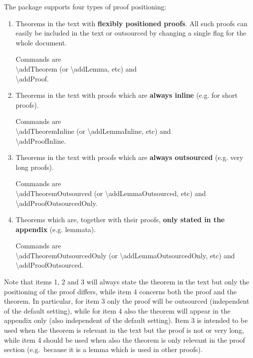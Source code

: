 \documentclass{article}
\begin{document}
		The package supports four types of proof positioning:
		\begin{enumerate}
			\item Theorems in the text with \textbf{flexibly positioned proofs}. All such proofs can easily be included in the text or outsourced by changing a single flag for the whole document.

				Commands are \\
				\textbackslash{}addTheorem (or \textbackslash{}addLemma, etc) and \\
				\textbackslash{}addProof.
			\item Theorems in the text with proofs which are \textbf{always inline} (e.g. for short proofs).

				Commands are \\
				\textbackslash{}addTheoremInline (or \textbackslash{}addLemmaInline, etc) and \\
				\textbackslash{}addProofInline.
			\item Theorems in the text with proofs which are \textbf{always outsourced} (e.g. very long proofs).

				Commands are \\
				\textbackslash{}addTheoremOutsourced (or \textbackslash{}addLemmaOutsourced, etc) and \\
				\textbackslash{}addProofOutsourcedOnly.
			\item Theorems which are, together with their proofs, \textbf{only stated in the appendix} (e.g. lemmata).

				Commands are \\
				\textbackslash{}addTheoremOutsourcedOnly (or \textbackslash{}addLemmaOutsourcedOnly, etc) and \\
				\textbackslash{}addProofOutsourced.
		\end{enumerate}
		
		Note that items 1, 2 and 3 will always state the theorem in the text but only the positioning of the proof differs,
		while item 4 concerns both the proof and the theorem.
		In particular, for item 3 only the proof will be outsourced (independent of the default setting),
		while for item 4 also the theorem will appear in the appendix only (also independent of the default setting).
		Item 3 is intended to be used when the theorem is relevant in the text but the proof is not or very long,
		while item 4 should be used when also the theorem is only relevant in the proof section (e.g.~because it is a lemma which is used in other proofs).
\end{document}
